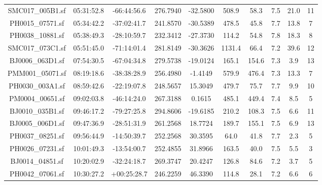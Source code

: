 \documentclass[fleqn,usenatbib]{mnras}
\begin{document}
\begin{table}
\begin{scriptsize}
\begin{center}
\begin{tabular}{@{\extracolsep{\fill}}c|c|c|c|c|c|c|c|c|c}
  SMC017\_005B1.sf    &   05:31:52.8  &   -66:44:56.6   &    276.7940    &    -32.5800    &    508.9    &    58.3    &    7.5    &    21.0    &    11    \\ 
  PH0015\_07571.sf    &   05:34:42.2  &   -37:02:41.7   &    241.8570    &    -30.5389    &    478.5    &    45.8    &    7.7    &    13.8    &    7    \\ 
  PH0038\_10881.sf    &   05:38:49.3  &   -28:10:59.7   &    232.3412    &    -27.3730    &    114.2    &    54.8    &    7.8    &    18.3    &    8    \\ 
  SMC017\_073C1.sf    &   05:51:45.0  &   -71:14:01.4   &    281.8149    &    -30.3626    &    1131.4    &    66.4    &    7.2    &    39.6    &    12    \\ 
  BJ0006\_063D1.sf    &   07:54:30.5  &   -67:04:34.8   &    279.5738    &    -19.0124    &    165.1    &    154.6    &    7.3    &    3.9    &    13    \\ 
  PMM001\_05071.sf    &   08:19:18.6  &   -38:38:28.9   &    256.4980    &    -1.4149    &    579.9    &    476.4    &    7.3    &    13.3    &    7    \\ 
  PH0030\_003A1.sf    &   08:59:42.6  &   -22:19:07.8   &    248.5657    &    15.3049    &    479.7    &    75.7    &    7.7    &    9.9    &    10    \\ 
  PM0004\_00651.sf    &   09:02:03.8  &   -46:14:24.0   &    267.3188    &    0.1615    &    485.1    &    449.4    &    7.4    &    8.5    &    5    \\ 
  BJ0010\_035B1.sf    &   09:46:17.2  &   -79:27:25.8   &    294.8606    &    -19.6185    &    210.2    &    108.3    &    7.5    &    6.6    &    11    \\ 
  BJ0005\_006D1.sf    &   09:47:36.9  &   -28:51:31.9   &    261.2568    &    18.7724    &    189.7    &    155.1    &    7.5    &    6.9    &    13    \\ 
  PH0037\_08251.sf    &   09:56:44.9  &   -14:50:39.7   &    252.2568    &    30.3595    &    64.0    &    41.8    &    7.7    &    2.3    &    5    \\ 
  PH0026\_07231.sf    &   10:01:49.3  &   -13:54:00.7   &    252.4855    &    31.8966    &    163.5    &    40.0    &    7.5    &    5.5    &    3    \\ 
  BJ0014\_04851.sf    &   10:20:02.9  &   -32:24:18.7   &    269.3747    &    20.4247    &    126.8    &    84.6    &    7.2    &    3.7    &    5    \\ 
  PH0042\_07061.sf    &   10:30:27.2  &   +00:25:28.7   &    246.2259    &    46.3390    &    114.8    &    28.1    &    7.2    &    6.6    &    6    \\ 

\end{tabular}
\end{center}
\end{scriptsize}
\end{table}
\end{document}
